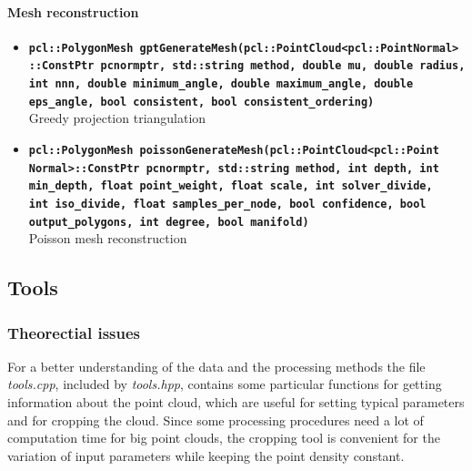 \documentclass[paper=a4,11pt,bibliography=totoc]{scrartcl}
\begin{document}
\paragraph*{Mesh reconstruction}
%
\begin{itemize}
\item \textbf{\texttt{pcl::PolygonMesh gptGenerateMesh(pcl::PointCloud<pcl::PointNormal>\\::ConstPtr pcnormptr, std::string method, double mu, double radius,\\int nnn, double minimum\_angle, double maximum\_angle, double\\eps\_angle, bool consistent, bool consistent\_ordering)}}\\
\textsf{Greedy projection triangulation}
\item \textbf{\texttt{pcl::PolygonMesh poissonGenerateMesh(pcl::PointCloud<pcl::Point\\Normal>::ConstPtr pcnormptr, std::string method, int depth, int\\min\_depth, float point\_weight, float scale, int solver\_divide,\\int iso\_divide, float samples\_per\_node, bool confidence, bool\\output\_polygons, int degree, bool manifold)}}\\
\textsf{Poisson mesh reconstruction}
\end{itemize}
%
\subsection{Tools}
%
\subsubsection*{\color{darkgreen}Theorectial issues}
%
For a better understanding of the data and the processing methods the file \textit{tools.cpp}, included by \textit{tools.hpp}, contains some particular functions for getting information about the point cloud, which are useful for setting typical parameters and for cropping the cloud. Since some processing procedures need a lot of computation time for big point clouds, the cropping tool is convenient for the variation of input parameters while keeping the point density constant.
%
\end{document}
